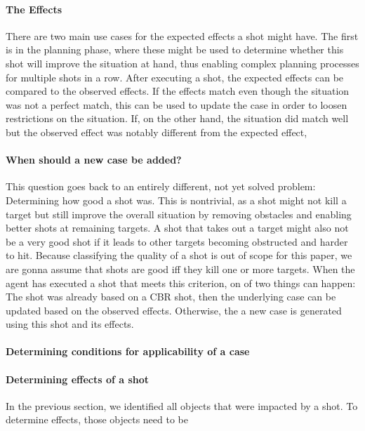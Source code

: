 \paragraph{The Effects}
There are two main use cases for the expected effects a shot might have. The first is in the planning phase, where these might be used to determine whether this shot will improve the situation at hand, thus enabling complex planning processes for multiple shots in a row.
After executing a shot, the expected effects can be compared to the observed effects. If the effects match even though the situation was not a perfect match, this can be used to update the case in order to loosen restrictions on the situation.
If, on the other hand, the situation did match well but the observed effect was notably different from the expected effect,

\paragraph{When should a new case be added?}
This question goes back to an entirely different, not yet solved problem: Determining how good a shot was.
This is nontrivial, as a shot might not kill a target but still improve the overall situation by removing obstacles and enabling better shots at remaining targets.
A shot that takes out a target might also not be a very good shot if it leads to other targets becoming obstructed and harder to hit.
Because classifying the quality of a shot is out of scope for this paper, we are gonna assume that shots are good iff they kill one or more targets.
When the agent has executed a shot that meets this criterion, on of two things can happen: The shot was already based on a CBR shot, then the underlying case can be updated based on the observed effects. Otherwise, the a new case is generated using this shot and its effects.

\paragraph{Determining conditions for applicability of a case}


\paragraph{Determining effects of a shot}
In the previous section, we identified all objects that were impacted by a shot.
To determine effects, those objects need to be

